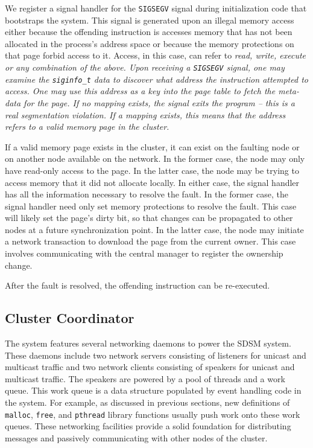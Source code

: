 We register a signal handler for the \verb,SIGSEGV, signal during initialization code that bootstraps the \projname{} system.  This signal is generated upon an illegal memory access either because the offending instruction is accesses memory that has not been allocated in the process's address space or because the memory protections on that page forbid access to it.  Access, in this case, can refer to \em read\em, \em write\em, \em execute \em or any combination of the above.  Upon receiving a \verb,SIGSEGV, signal, one may examine the \verb,siginfo_t, data to discover what address the instruction attempted to access.  One may use this address as a key into the page table to fetch the meta-data for the page.  If no mapping exists, the signal exits the program -- this is a real segmentation violation.  If a mapping exists, this means that the address refers to a valid memory page in the cluster.

If a valid memory page exists in the cluster, it can exist on the faulting node or on another node available on the network.  In the former case, the node may only have read-only access to the page.  In the latter case, the node may be trying to access memory that it did not allocate locally.  In either case, the signal handler has all the information necessary to resolve the fault.  In the former case, the signal handler need only set memory protections to resolve the fault.  This case will likely set the page's dirty bit, so that changes can be propagated to other nodes at a future synchronization point.  In the latter case, the node may initiate a network transaction to download the page from the current owner.  This case involves communicating with the central manager to register the ownership change.

After the fault is resolved,  the offending instruction can be re-executed.

\subsection{Cluster Coordinator}
\label{cluster-coordinator}

The \projname{} system features several networking daemons to power the SDSM system.  These daemons include two network servers consisting of listeners for unicast and multicast traffic and two network clients consisting of speakers for unicast and multicast traffic.  The speakers are powered by a pool of threads and a work queue.  This work queue is a data structure populated by event handling code in the system.  For example, as discussed in previous sections, new definitions of \verb,malloc,, \verb,free,, and \verb,pthread, library functions usually push work onto these work queues.  These networking facilities provide a solid foundation for distributing messages and passively communicating with other nodes of the cluster.

